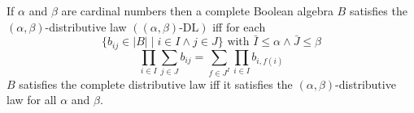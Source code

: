 If $\alpha$ and $\beta$ are cardinal numbers then a complete Boolean algebra $B$ satisfies the $(\alpha, \beta)$-distributive law $((\alpha, \beta)\text{-DL})$ iff for each
$$\{b_{ij} \in |B| \mid i \in I \land j \in J\} \text{ with } \bar{I} \leq \alpha \land \bar{J} \leq \beta$$
$$\prod_{i \in I} \sum_{j \in J} b_{ij} = \sum_{f \in J^I} \prod_{i \in I} b_{i,f(i)}$$
$B$ satisfies the complete distributive law iff it satisfies the $(\alpha, \beta)$-distributive law for all $\alpha$ and $\beta$.
